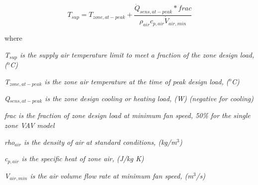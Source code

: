 \begin{equation}
T_{sup} = T_{zone,at-peak}+\frac{\dot{Q}_{sens,at-peak} * frac}{\rho_{air}c_{p,air}\dot{V}_{air,min}}
\end{equation}

where

\emph{T\(_{sup}\) is the supply air temperature limit to meet a fraction of the zone design load, (\(^{o}\)C)}

\emph{T\(_{zone,at-peak}\) is the zone air temperature at the time of peak design load, (\(^{o}\)C)}

\emph{Q\(_{sens,at-peak}\) is the zone design cooling or heating load, (W) (negative for cooling)}

\emph{frac is the fraction of zone design load at minimum fan speed, 50\% for the single zone VAV model}

\emph{rho\(_{air}\) is the density of air at standard conditions, (kg/m\(^{3}\))}

\emph{c\(_{p,air}\) is the specific heat of zone air, (J/kg K)}

\emph{V\(_{air,min}\) is the air volume flow rate at minimum fan speed, (m\(^{3}\)/s)}



